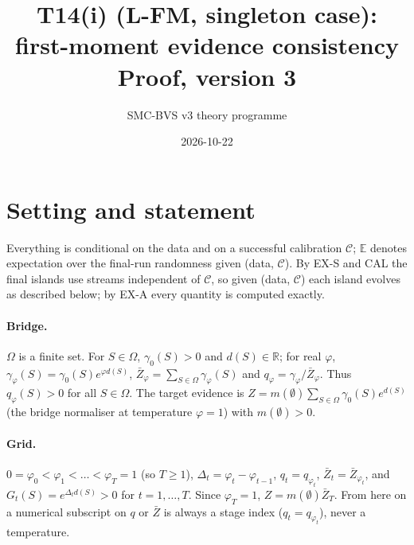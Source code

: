 \documentclass[11pt]{article}
\title{T14(i) (L-FM, singleton case): first-moment evidence consistency\\[2pt]
\large Proof, version 3}
\author{SMC-BVS v3 theory programme}
\date{2026-10-22}
\theoremstyle{remark}
\newcommand{\E}{\mathbb{E}}
\newcommand{\Om}{\Omega}
\newcommand{\Zb}{\bar Z}
\begin{document}
\maketitle

\section{Setting and statement}

Everything is conditional on the data and on a successful calibration $\mathcal C$; $\E$ denotes expectation over the
final-run randomness given (data, $\mathcal C$). By EX-S and CAL the final islands use streams independent of $\mathcal C$,
so given (data, $\mathcal C$) each island evolves as described below; by EX-A every quantity is computed exactly.

\paragraph{Bridge.} $\Om$ is a finite set. For $S\in\Om$, $\gamma_0(S)>0$ and $d(S)\in\mathbb R$; for real $\varphi$,
$\gamma_\varphi(S)=\gamma_0(S)e^{\varphi d(S)}$, $\Zb_\varphi=\sum_{S\in\Om}\gamma_\varphi(S)$ and
$q_\varphi=\gamma_\varphi/\Zb_\varphi$. Thus $q_\varphi(S)>0$ for all $S\in\Om$. The target evidence is
$Z=m(\emptyset)\sum_{S\in\Om}\gamma_0(S)e^{d(S)}$ (the bridge normaliser at temperature $\varphi=1$) with $m(\emptyset)>0$.

\paragraph{Grid.} $0=\varphi_0<\varphi_1<\dots<\varphi_T=1$ (so $T\ge1$), $\Delta_t=\varphi_t-\varphi_{t-1}$,
$q_t=q_{\varphi_t}$, $\Zb_t=\Zb_{\varphi_t}$, and $G_t(S)=e^{\Delta_t d(S)}>0$ for $t=1,\dots,T$. Since $\varphi_T=1$, $Z=m(\emptyset)\Zb_T$. From here on a numerical subscript on $q$ or $\Zb$ is always a stage index ($q_t=q_{\varphi_t}$), never a temperature.
\end{document}
